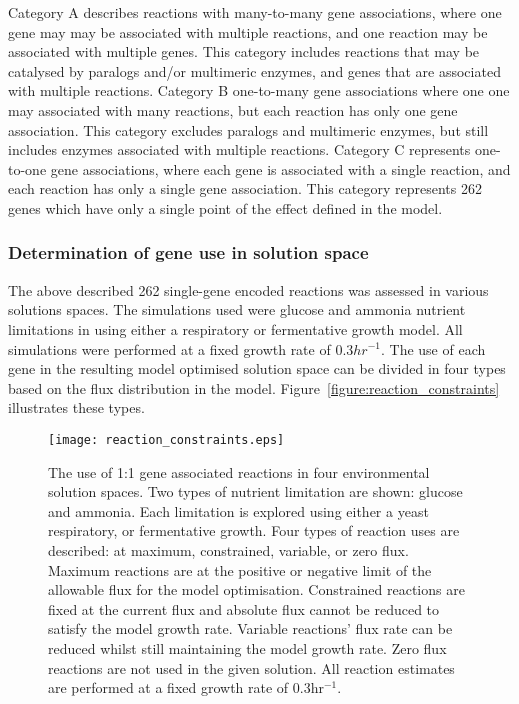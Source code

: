 Category A describes reactions with many-to-many gene associations, where one gene may may be associated with multiple reactions, and one reaction may be associated with multiple genes. This category includes reactions that may be catalysed by paralogs and/or multimeric enzymes, and genes that are associated with multiple reactions. Category B one-to-many gene associations where one one may associated with many reactions, but each reaction has only one gene association. This category excludes paralogs and multimeric enzymes, but still includes enzymes associated with multiple reactions. Category C represents one-to-one gene associations, where each gene is associated with a single reaction, and each reaction has only a single gene association. This category represents 262 genes which have only a single point of the effect defined in the model.

\subsubsection{Determination of gene use in solution space}

The above described 262 single-gene encoded reactions was assessed in various solutions spaces. The simulations used were glucose and ammonia nutrient limitations in using either a respiratory or fermentative growth model. All simulations were performed at a fixed growth rate of 0.3$hr^{-1}$. The use of each gene in the resulting model optimised solution space can be divided in four types based on the flux distribution in the model. Figure~\vref{figure:reaction_constraints} illustrates these types.

\begin{figure}
\centering
\texttt{[image: reaction\_constraints.eps]}
\caption[Gene use in model optimised solution space]{The use of 1:1 gene associated reactions in four environmental solution spaces. Two types of nutrient limitation are shown: glucose and ammonia. Each limitation is explored using either a yeast respiratory, or fermentative growth. Four types of reaction uses are described: at maximum, constrained, variable, or zero flux. Maximum reactions are at the positive or negative limit of the allowable flux for the model optimisation. Constrained reactions are fixed at the current flux and absolute flux cannot be reduced to satisfy the model growth rate. Variable reactions' flux rate can be reduced whilst still maintaining the model growth rate. Zero flux reactions are not used in the given solution. All reaction estimates are performed at a fixed growth rate of 0.3hr$^{-1}$. }
\label{figure:reaction_constraints}
\end{figure}


